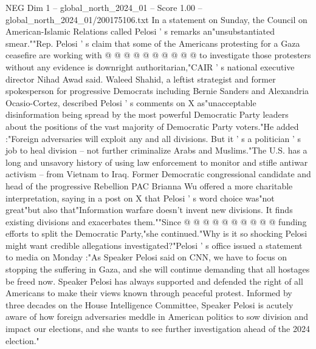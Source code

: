 \begin{textsample}{NEG Dim 1 – global\_north\_2024\_01 – Score 1.00 – global\_north\_2024\_01/200175106.txt}
In a statement on Sunday, the Council on American-Islamic Relations called Pelosi ' s remarks an"unsubstantiated smear.""Rep.
Pelosi ' s claim that some of the Americans protesting for a Gaza ceasefire are working with @ @ @ @ @ @ @ @ @ @ to investigate those protesters without any evidence is downright authoritarian,"CAIR ' s national executive director Nihad Awad said.
Waleed Shahid, a leftist strategist and former spokesperson for progressive Democrats including Bernie Sanders and Alexandria Ocasio-Cortez, described Pelosi ' s comments on X as"unacceptable disinformation being spread by the most powerful Democratic Party leaders about the positions of the vast majority of Democratic Party voters."He added :"Foreign adversaries will exploit any and all divisions.
But it ' s a politician ' s job to heal division -- not further criminalize Arabs and Muslims."The U.S. has a long and unsavory history of using law enforcement to monitor and stifle antiwar activism -- from Vietnam to Iraq.
Former Democratic congressional candidate and head of the progressive Rebellion PAC Brianna Wu offered a more charitable interpretation, saying in a post on X that Pelosi ' s word choice was"not great"but also that"Information warfare doesn't invent new divisions.
It finds existing divisions and exacerbates them.""Since @ @ @ @ @ @ @ @ @ @ funding efforts to split the Democratic Party,"she continued."Why is it so shocking Pelosi might want credible allegations investigated?"Pelosi ' s office issued a statement to media on Monday :"As Speaker Pelosi said on CNN, we have to focus on stopping the suffering in Gaza, and she will continue demanding that all hostages be freed now.
Speaker Pelosi has always supported and defended the right of all Americans to make their views known through peaceful protest.
Informed by three decades on the House Intelligence Committee, Speaker Pelosi is acutely aware of how foreign adversaries meddle in American politics to sow division and impact our elections, and she wants to see further investigation ahead of the 2024 election."

\end{textsample}
